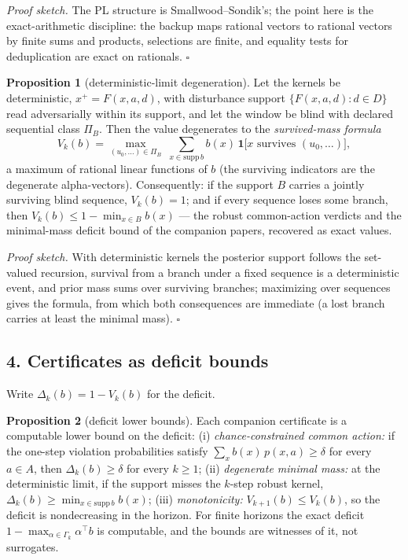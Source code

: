 \documentclass[10pt,twocolumn]{article}
\theoremstyle{definition}
\newtheorem{proposition}{Proposition}
\begin{document}
\emph{Proof sketch.} The PL structure is Smallwood--Sondik's; the point
here is the exact-arithmetic discipline: the backup maps rational vectors
to rational vectors by finite sums and products, selections are finite, and
equality tests for deduplication are exact on rationals.
\hfill\(\square\)

\begin{proposition}[deterministic-limit degeneration]\label{prop:degen}
Let the kernels be deterministic, \(x^{+} = F(x, a, d)\), with disturbance
support \(\{F(x,a,d) : d \in D\}\) read adversarially within its support,
and let the window be blind with declared sequential class \(\Pi_{B}\).
Then the value degenerates to the \emph{survived-mass formula}
\[
V_{k}(b) = \max_{(u_{0},\dots) \in \Pi_{B}}\;
\sum_{x \in \mathrm{supp}\, b} b(x)\,
\mathbf{1}\bigl[ x \text{ survives } (u_{0}, \dots) \bigr],
\]
a maximum of rational linear functions of \(b\) (the surviving indicators
are the degenerate alpha-vectors). Consequently: if the support \(B\)
carries a jointly surviving blind sequence, \(V_{k}(b) = 1\); and if every
sequence loses some branch, then \(V_{k}(b) \le 1 - \min_{x \in B} b(x)\)
--- the robust common-action verdicts and the minimal-mass deficit bound of
the companion papers, recovered as exact values.
\end{proposition}

\emph{Proof sketch.} With deterministic kernels the posterior support
follows the set-valued recursion, survival from a branch under a fixed
sequence is a deterministic event, and prior mass sums over surviving
branches; maximizing over sequences gives the formula, from which both
consequences are immediate (a lost branch carries at least the minimal
mass). \hfill\(\square\)

\subsection{4. Certificates as deficit bounds}\label{deficit}

Write \(\Delta_{k}(b) = 1 - V_{k}(b)\) for the deficit.

\begin{proposition}[deficit lower bounds]\label{prop:deficit}
Each companion certificate is a computable lower bound on the deficit:
(i) \emph{chance-constrained common action:} if the one-step violation
probabilities satisfy \(\sum_{x} b(x)\, p(x, a) \ge \delta\) for every
\(a \in A\), then \(\Delta_{k}(b) \ge \delta\) for every \(k \ge 1\);
(ii) \emph{degenerate minimal mass:} at the deterministic limit, if the
support misses the \(k\)-step robust kernel,
\(\Delta_{k}(b) \ge \min_{x \in \mathrm{supp}\, b} b(x)\);
(iii) \emph{monotonicity:} \(V_{k+1}(b) \le V_{k}(b)\), so the deficit is
nondecreasing in the horizon. For finite horizons the exact deficit
\(1 - \max_{\alpha \in \Gamma_{k}} \alpha^{\top} b\) is computable, and the
bounds are witnesses of it, not surrogates.
\end{proposition}
\end{document}
